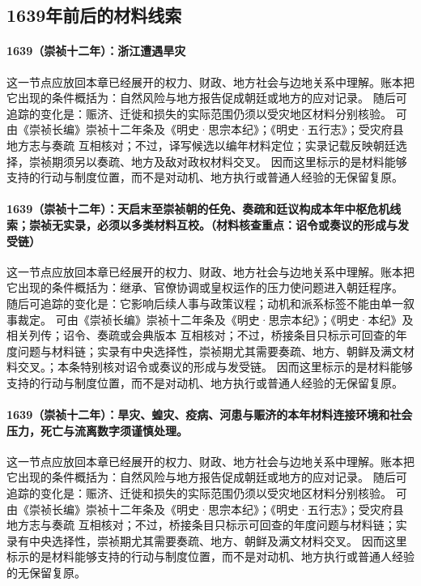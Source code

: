 \subsection{1639年前后的材料线索}

\paragraph{1639（崇祯十二年）：浙江遭遇旱灾} 这一节点应放回本章已经展开的权力、财政、地方社会与边地关系中理解。账本把它出现的条件概括为：自然风险与地方报告促成朝廷或地方的应对记录。 随后可追踪的变化是：赈济、迁徙和损失的实际范围仍须以受灾地区材料分别核验。 可由《崇祯长编》崇祯十二年条及《明史·思宗本纪》；《明史·五行志》；受灾府县地方志与奏疏 互相核对；不过，译写候选以编年材料定位；实录记载反映朝廷选择，崇祯期须另以奏疏、地方及敌对政权材料交叉。 因而这里标示的是材料能够支持的行动与制度位置，而不是对动机、地方执行或普通人经验的无保留复原。

\paragraph{1639（崇祯十二年）：天启末至崇祯朝的任免、奏疏和廷议构成本年中枢危机线索；崇祯无实录，必须以多类材料互校。（材料核查重点：诏令或奏议的形成与发受链）} 这一节点应放回本章已经展开的权力、财政、地方社会与边地关系中理解。账本把它出现的条件概括为：继承、官僚协调或皇权运作的压力使问题进入朝廷程序。 随后可追踪的变化是：它影响后续人事与政策议程；动机和派系标签不能由单一叙事裁定。 可由《崇祯长编》崇祯十二年条及《明史·思宗本纪》；《明史·本纪》及相关列传；诏令、奏疏或会典版本 互相核对；不过，桥接条目只标示可回查的年度问题与材料链；实录有中央选择性，崇祯期尤其需要奏疏、地方、朝鲜及满文材料交叉。；本条特别核对诏令或奏议的形成与发受链。 因而这里标示的是材料能够支持的行动与制度位置，而不是对动机、地方执行或普通人经验的无保留复原。

\paragraph{1639（崇祯十二年）：旱灾、蝗灾、疫病、河患与赈济的本年材料连接环境和社会压力，死亡与流离数字须谨慎处理。} 这一节点应放回本章已经展开的权力、财政、地方社会与边地关系中理解。账本把它出现的条件概括为：自然风险与地方报告促成朝廷或地方的应对记录。 随后可追踪的变化是：赈济、迁徙和损失的实际范围仍须以受灾地区材料分别核验。 可由《崇祯长编》崇祯十二年条及《明史·思宗本纪》；《明史·五行志》；受灾府县地方志与奏疏 互相核对；不过，桥接条目只标示可回查的年度问题与材料链；实录有中央选择性，崇祯期尤其需要奏疏、地方、朝鲜及满文材料交叉。 因而这里标示的是材料能够支持的行动与制度位置，而不是对动机、地方执行或普通人经验的无保留复原。

